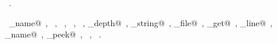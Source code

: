 \documentclass{report}
\begin{document}
\begin{flushleft}
\begin{minipage}{\linewidth}
\begin{list}{}{\setlength{\itemsep}{-\parsep}\setlength{\itemindent}{-\leftmargin}}
\item \NWtxtMacroRefIn\ .
\end{list}
\vspace{-2ex}
\footnotesize\addtolength{\baselineskip}{-1ex}
\begin{list}{}{\setlength{\itemsep}{-\parsep}\setlength{\itemindent}{-\leftmargin}}
\item \NWtxtIdentsUsed\nobreak\  \verb@command_name@\nobreak\ , \verb@exit@\nobreak\ , \verb@fopen@\nobreak\ , \verb@fprintf@\nobreak\ , \verb@getc@\nobreak\ , \verb@include_depth@\nobreak\ , \verb@save_string@\nobreak\ , \verb@source_file@\nobreak\ , \verb@source_get@\nobreak\ , \verb@source_line@\nobreak\ , \verb@source_name@\nobreak\ , \verb@source_peek@\nobreak\ , \verb@stack@\nobreak\ , \verb@stderr@\nobreak\ .\end{list}
\end{minipage}\\[4ex]
\end{flushleft}
\end{document}
